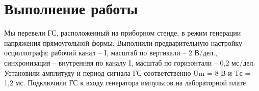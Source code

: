 \section{Выполнение работы}

Мы перевели ГС, расположенный на приборном стенде, в режим
генерации напряжения прямоугольной формы. Выполнили предварительную
настройку осциллографа: рабочий канал – I, масштаб по вертикали – 2
В/дел., синхронизация – внутренняя по каналу I, масштаб по горизонтали
– 0,2 мс/дел. Установили амплитуду и период
сигнала ГС соответственно Um = 8 В и Tс = 1,2 мс. Подключили ГС к
входу генератора импульсов на лабораторной плате.


\newpage


